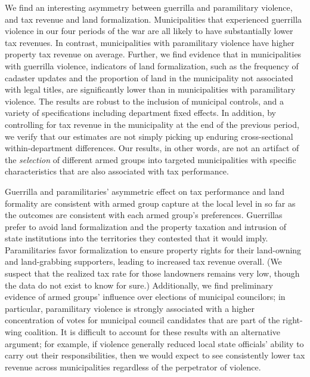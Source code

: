 We find an interesting asymmetry between guerrilla and paramilitary violence, and tax revenue and land formalization. Municipalities that experienced guerrilla violence in our four periods of the war are all likely to have substantially lower tax revenues. In contrast, municipalities with paramilitary violence have higher property tax revenue on average. Further, we find evidence that in municipalities with guerrilla violence, indicators of land formalization, such as the frequency of cadaster updates and the proportion of land in the municipality not associated with legal titles, are significantly lower than in municipalities with paramilitary violence. The results are robust to the inclusion of municipal controls, and a variety of specifications including department fixed effects. In addition, by controlling for tax revenue in the municipality at the end of the previous period, we verify that our estimates are not simply picking up enduring cross-sectional within-department differences. Our results, in other words, are not an artifact of the {\it selection} of different armed groups into targeted municipalities with specific characteristics that are also associated with tax performance. %

Guerrilla and paramilitaries' asymmetric effect on tax performance and land formality are consistent with armed group capture at the local level in so far as the outcomes are consistent with each armed group's preferences. Guerrillas prefer to avoid land formalization and the property taxation and intrusion of state institutions into the territories they contested that it would imply. Paramilitaries favor formalization to ensure property rights for their land-owning and land-grabbing supporters, leading to increased tax revenue overall. (We suspect that the realized tax rate for those landowners remains very low, though the data do not exist to know for sure.) Additionally, we find preliminary evidence of armed groups' influence over elections of municipal councilors; in particular, paramilitary violence is strongly associated with a higher concentration of votes for municipal council candidates that are part of the right-wing coalition. It is difficult to account for these results with an alternative argument; for example, if violence generally reduced local state officials' ability to carry out their responsibilities, then we would expect to see consistently lower tax revenue across municipalities regardless of the perpetrator of violence. 

